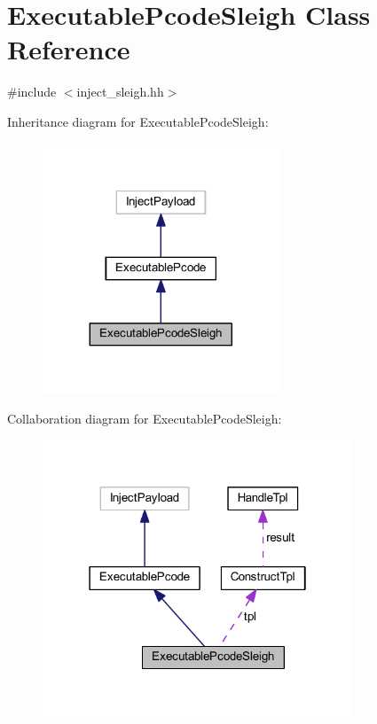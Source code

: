 \hypertarget{class_executable_pcode_sleigh}{}\section{Executable\+Pcode\+Sleigh Class Reference}
\label{class_executable_pcode_sleigh}


{\ttfamily \#include $<$inject\+\_\+sleigh.\+hh$>$}



Inheritance diagram for Executable\+Pcode\+Sleigh\+:
\nopagebreak
\begin{figure}[H]
\begin{center}
\leavevmode
\includegraphics[width=200pt]{class_executable_pcode_sleigh__inherit__graph}
\end{center}
\end{figure}


Collaboration diagram for Executable\+Pcode\+Sleigh\+:
\nopagebreak
\begin{figure}[H]
\begin{center}
\leavevmode
\includegraphics[width=262pt]{class_executable_pcode_sleigh__coll__graph}
\end{center}
\end{figure}
